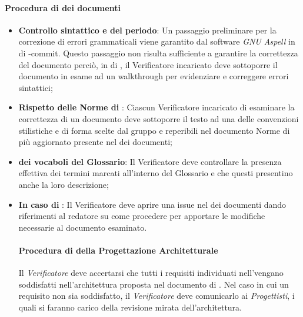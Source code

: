 \paragraph*{Procedura di  dei documenti}
\begin{itemize}
\item \textbf{Controllo sintattico e del periodo}: Un passaggio preliminare per la correzione di errori grammaticali viene garantito dal software \textit{GNU Aspell} in  di -commit. Questo passaggio non risulta sufficiente a garantire la correttezza del documento perciò, in  di , il Verificatore incaricato deve sottoporre il documento in esame ad un walkthrough per evidenziare e correggere errori sintattici;
  \item \textbf{Rispetto delle Norme di }: Ciascun Verificatore incaricato di esaminare la correttezza di un documento deve sottoporre il testo ad una  delle convenzioni stilistiche e di forma scelte dal gruppo e reperibili nel documento Norme di  pi\`u aggiornato presente nel  dei documenti;
  \item \textbf{ dei vocaboli del Glossario}: Il Verificatore deve controllare la presenza effettiva dei termini marcati all'interno del Glossario e che questi presentino anche la loro descrizione;
  \item \textbf{In caso di }: Il Verificatore deve aprire una issue nel  dei documenti dando riferimenti al redatore su come procedere per apportare le modifiche necessarie al documento esaminato.

\paragraph*{Procedura di  della Progettazione Architetturale}
Il \textit{Verificatore} deve accertarsi che tutti i requisiti individuati nell'\AnalisiDeiRequisiti vengano soddisfatti
nell'architettura proposta nel documento di \SpecificaTecnica.
Nel caso in cui un requisito non sia soddisfatto, il \textit{Verificatore} deve comunicarlo ai \textit{Progettisti}, i quali
si faranno carico della revisione mirata dell'architettura. 

\end{itemize}

